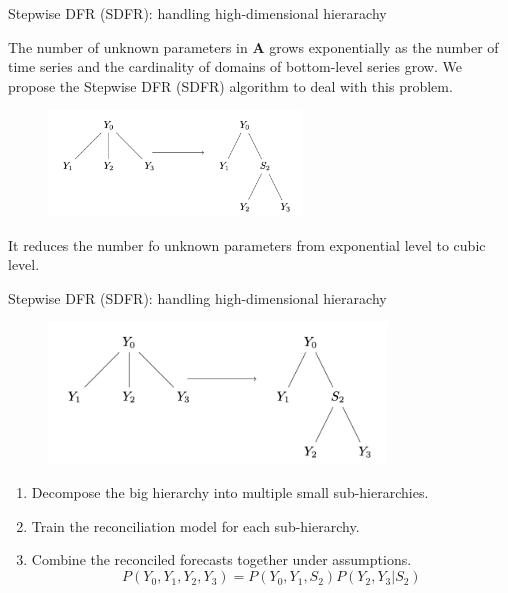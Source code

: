 \documentclass[12pt]{beamer}
\begin{document}
\begin{frame}{Stepwise DFR (SDFR): handling high-dimensional hierarachy}
    \begin{outline}
    \1 The number of unknown parameters in $\mathbf{A}$ grows exponentially as the number of time series and the cardinality of domains of bottom-level series grow.
    \1 We propose the Stepwise DFR (SDFR) algorithm to deal with this problem.    
    \begin{figure}
    \centering
    \includegraphics[width=0.6\textwidth]{figures/sdfr.png}    
    \end{figure}

    \1 It reduces the number fo unknown parameters from exponential level to cubic level.
    \end{outline}
    
\end{frame}


\begin{frame}{Stepwise DFR (SDFR): handling high-dimensional hierarachy}
    \begin{figure}
        \centering
        \includegraphics[width=0.8\textwidth]{figures/sdfr.png}    
    \end{figure}

\begin{enumerate}
    \item Decompose the big hierarchy into multiple small sub-hierarchies.
    \item Train the reconciliation model for each sub-hierarchy.
    \item Combine the reconciled forecasts together under assumptions.
    \[
      P(Y_0, Y_1, Y_2, Y_3) = P(Y_0, Y_1, S_2) P(Y_2, Y_3|S_2)  
    \]
\end{enumerate}
\end{frame}
\end{document}
